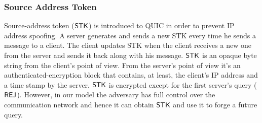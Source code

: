 \subsubsection{Source Address Token} \label{sec:source_address_token}
Source-address token ($\mathsf{STK}$) is introduced to QUIC in order to
prevent IP address spoofing.
A server generates and sends a new STK every time he sends a
message to a client.
The client updates STK when the client receives a new one from
the server and sends it back along with his message.
$\mathsf{STK}$ is an opaque byte string from the client's point of view.
From the server's point of view it's an authenticated-encryption
block that contains, at least, the client's IP address and a time
stamp by the server.
$\mathsf{STK}$ is encrypted except for the first server's query ($\mathsf{REJ}$).
However, in our model the adversary has full control over the
communication network and hence it can obtain $\mathsf{STK}$ and use it to
forge a future query.